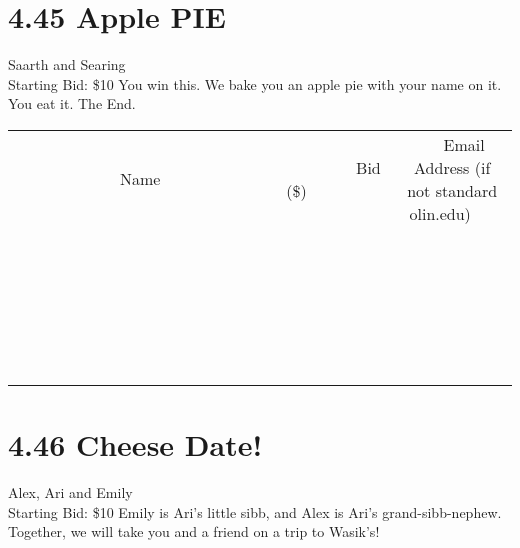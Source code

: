 \documentclass[11pt]{article}
\begin{document}
\section*{4.45 Apple PIE}
Saarth and Searing
\\
Starting Bid: \$10
\newline
You win this. We bake you an apple pie with your name on it. You eat it. The End.
\\[6ex]
\begin{tabular}{c c c}
~~~~~~~~~~~~~Name~~~~~~~~~~~~~ & ~~~~~~~~~Bid (\$)~~~~~~~~~  & ~~~Email Address (if not standard olin.edu)~~~\\
 & & \\
\hline
 & & \\
\hline
 & & \\
\hline
 & & \\
\hline
 & & \\
\hline
 & & \\
\hline
 & & \\
\hline
 & & \\
\hline
 & & \\
\hline
 & & \\
\hline
 & & \\
\hline
 & & \\
\hline
 & & \\
\hline
 & & \\
\hline
 & & \\
\hline
 & & \\
\hline
 & & \\
\hline
 & & \\
\hline
 & & \\
\hline
 & & \\
\hline
 & & \\
\hline
 & & \\
\hline
 & & \\
\hline
 & & \\
\hline
 & & \\
\hline
 & & \\
\hline
\end{tabular}
\newpage
\section*{4.46 Cheese Date!}
Alex, Ari and Emily
\\
Starting Bid: \$10
\newline
Emily is Ari's little sibb, and Alex is Ari's grand-sibb-nephew. Together, we will take you and a friend on a trip to Wasik's!
\end{document}
